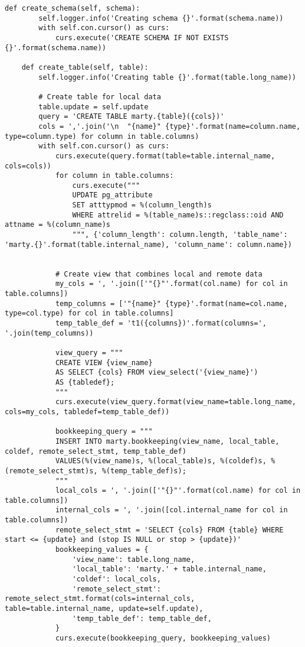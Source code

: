\begin{lstlisting}[caption={utils/populator.py}]
    def create_schema(self, schema):
        self.logger.info('Creating schema {}'.format(schema.name))
        with self.con.cursor() as curs:
            curs.execute('CREATE SCHEMA IF NOT EXISTS {}'.format(schema.name))

    def create_table(self, table):
        self.logger.info('Creating table {}'.format(table.long_name))

        # Create table for local data
        table.update = self.update
        query = 'CREATE TABLE marty.{table}({cols})'
        cols = ','.join('\n  "{name}" {type}'.format(name=column.name, type=column.type) for column in table.columns)
        with self.con.cursor() as curs:
            curs.execute(query.format(table=table.internal_name, cols=cols))
            for column in table.columns:
                curs.execute("""
                UPDATE pg_attribute
                SET atttypmod = %(column_length)s
                WHERE attrelid = %(table_name)s::regclass::oid AND attname = %(column_name)s
                """, {'column_length': column.length, 'table_name': 'marty.{}'.format(table.internal_name), 'column_name': column.name})


            # Create view that combines local and remote data
            my_cols = ', '.join(['"{}"'.format(col.name) for col in table.columns])
            temp_columns = ['"{name}" {type}'.format(name=col.name, type=col.type) for col in table.columns]
            temp_table_def = 't1({columns})'.format(columns=', '.join(temp_columns))

            view_query = """
            CREATE VIEW {view_name}
            AS SELECT {cols} FROM view_select('{view_name}')
            AS {tabledef};
            """
            curs.execute(view_query.format(view_name=table.long_name, cols=my_cols, tabledef=temp_table_def))

            bookkeeping_query = """
            INSERT INTO marty.bookkeeping(view_name, local_table, coldef, remote_select_stmt, temp_table_def)
            VALUES(%(view_name)s, %(local_table)s, %(coldef)s, %(remote_select_stmt)s, %(temp_table_def)s);
            """
            local_cols = ', '.join(['"{}"'.format(col.name) for col in table.columns])
            internal_cols = ', '.join([col.internal_name for col in table.columns])
            remote_select_stmt = 'SELECT {cols} FROM {table} WHERE start <= {update} and (stop IS NULL or stop > {update})'
            bookkeeping_values = {
                'view_name': table.long_name,
                'local_table': 'marty.' + table.internal_name,
                'coldef': local_cols,
                'remote_select_stmt': remote_select_stmt.format(cols=internal_cols, table=table.internal_name, update=self.update),
                'temp_table_def': temp_table_def,
            }
            curs.execute(bookkeeping_query, bookkeeping_values)


\end{lstlisting}
